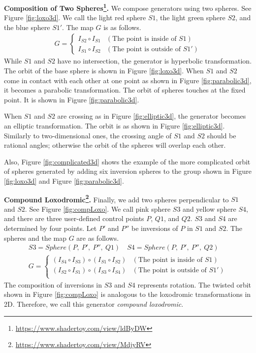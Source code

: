 \noindent\textbf{Composition of Two
Spheres\footnote{\url{https://www.shadertoy.com/view/ldByDW}}.}
We compose generators using two spheres.
See Figure \ref{fig:loxo3d}.
We call the light red sphere $S1$, the light green sphere $S2$, and the blue
sphere $S1'$.
The map $G$ is as follows.
\begin{align*}
G =
\begin{cases}
 I_{S2} \circ I_{S1} & (\text{The point is inside of } S1) \\
 I_{S1} \circ I_{S2} & (\text{The point is outside of }S1')
\end{cases}
\end{align*}
While $S1$ and $S2$ have no intersection, the generator is hyperbolic
transformation.
The orbit of the base sphere is shown in Figure \ref{fig:loxo3d}.
When $S1$ and $S2$ come in contact with each other at one point as shown
in Figure \ref{fig:parabolic3d}, it becomes a
parabolic transformation.
The orbit of spheres touches at the fixed point.
It is shown in Figure \ref{fig:parabolic3d}.

When $S1$ and $S2$ are crossing as in Figure \ref{fig:elliptic3d},
the generator becomes an elliptic transformation.
The orbit is as shown in Figure \ref{fig:elliptic3d}.
Similarly to two-dimensional ones, the crossing angle of $S1$ and $S2$
should be rational angles;
otherwise the orbit of the spheres will overlap each other.

Also, Figure \ref{fig:complicated3d} shows the example of the more
complicated orbit of spheres generated by adding six inversion spheres to
the group shown in Figure \ref{fig:loxo3d} and Figure \ref{fig:parabolic3d}.

\noindent\textbf{Compound
Loxodromic\footnote{\url{https://www.shadertoy.com/view/MdjyRV}}.}
Finally, we add two spheres perpendicular to $S1$ and $S2$.
See Figure \ref{fig:compLoxo}.
We call pink sphere $S3$ and yellow sphere $S4$, and there are three
user-defined control points $P$, $Q1$, and $Q2$.
$S3$ and $S4$ are determined by four points.
Let $P'$ and $P''$ be inversions of $P$ in $S1$ and $S2$.
The spheres and the map $G$ are as follows.
\begin{align*}
S3 = Sphere(P,~P',~P'',~Q1) \quad
S4 = Sphere(P,~P',~P'',~Q2) \\
G =
\begin{cases}
 (I_{S4} \circ I_{S3}) \circ (I_{S1} \circ I_{S2}) & (\text{The point is inside of } S1) \\
 (I_{S2} \circ I_{S1}) \circ (I_{S3} \circ I_{S4}) & (\text{The point is outside of }S1')\\
\end{cases}
\end{align*}
The composition of inversions in $S3$ and $S4$ represents rotation.
The twisted orbit shown in Figure
\ref{fig:compLoxo} is analogous to the loxodromic
transformations in 2D.
Therefore, we call this generator \textit{compound loxodromic}.


